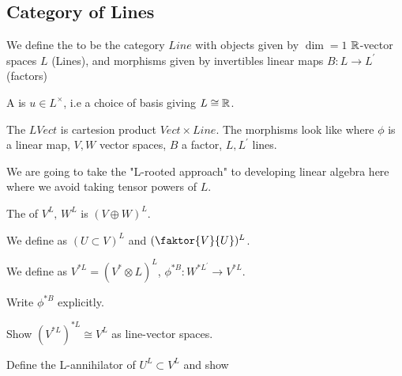 \documentclass{article}
\begin{document}
\subsection{Category of Lines}

\begin{definition}
	We define the  to be the category $Line$ with objects given by $\dim=1$ $\mathbb{R}$-vector spaces $L$ (Lines), and morphisms given by invertibles linear maps $B : L \to  L^\prime$ (factors)
\end{definition}

\begin{definition}
	A  is $u \in L^\times$, i.e a choice of basis giving $L \cong \mathbb{R}$. 
\end{definition}

\begin{definition}
	The  $LVect$ is cartesion product $Vect \times Line$. The morphisms look like 
where $\phi$ is a linear map, $V,W$ vector spaces, $B$ a factor, $L,L^\prime$ lines. 
\end{definition}

We are going to take the "L-rooted approach" to developing linear algebra here where we avoid taking tensor powers of $L$. 

\begin{definition}
	The  of $V^L, \, W^{L}$ is $(V \oplus W)^L$.  
\end{definition}

\begin{definition}
	We define  as $(U \subset V)^L$ and $(\faktor{V}{U})^L$. 
\end{definition}

\begin{definition}
	We define  as $V^{\ast L} = (V^\ast \otimes L)^L$, $\phi^{\ast B} : W^{\ast L^\prime} \to V^{\ast L}$. 
\end{definition}

\begin{ex}
Write $\phi^{\ast B}$ explicitly. 
\end{ex}

\begin{ex}
	Show $(V^{\ast L})^{\ast L} \cong V^L$ as line-vector spaces. 
\end{ex}

\begin{ex}
	Define the L-annihilator of $U^L \subset V^L$ and show
\end{ex}
\end{document}
